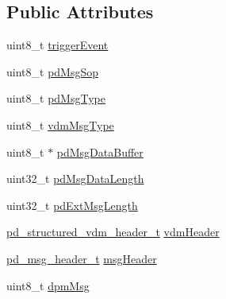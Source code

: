 \subsection*{Public Attributes}
\begin{DoxyCompactItemize}
\item 
uint8\-\_\-t \hyperlink{struct__psm__trigger__info_a4ad5cd13544e540fbd9a6bb06a041732}{trigger\-Event}
\item 
uint8\-\_\-t \hyperlink{struct__psm__trigger__info_a27c2acd560222336245db0a281cc5c1c}{pd\-Msg\-Sop}
\item 
uint8\-\_\-t \hyperlink{struct__psm__trigger__info_a0c8121495f67a38197784329ebbc1d8e}{pd\-Msg\-Type}
\item 
uint8\-\_\-t \hyperlink{struct__psm__trigger__info_a3a905de589c3b9f39958a1597865286b}{vdm\-Msg\-Type}
\item 
uint8\-\_\-t $\ast$ \hyperlink{struct__psm__trigger__info_ab8dad32f7d50d933824c9ea766850ab8}{pd\-Msg\-Data\-Buffer}
\item 
uint32\-\_\-t \hyperlink{struct__psm__trigger__info_a66249e3b8cea619fbf9a42e72fba5c18}{pd\-Msg\-Data\-Length}
\item 
uint32\-\_\-t \hyperlink{struct__psm__trigger__info_af56dc6655fd68a5ff26971f036d93383}{pd\-Ext\-Msg\-Length}
\item 
\hyperlink{group__usb__pd__stack_ga245b8bec3f3b7771e73016ac98595570}{pd\-\_\-structured\-\_\-vdm\-\_\-header\-\_\-t} \hyperlink{struct__psm__trigger__info_a7a85c1bb9ac095e9b66d4c147496d5f4}{vdm\-Header}
\item 
\hyperlink{group__usb__pd__stack_ga38ef16bfe01e9e07d6b3ac77648c6bee}{pd\-\_\-msg\-\_\-header\-\_\-t} \hyperlink{struct__psm__trigger__info_a2d5eac633a3f806ce33111067b23c6df}{msg\-Header}
\item 
uint8\-\_\-t \hyperlink{struct__psm__trigger__info_ad7f05d06a3113ff4fa5ea1cb6cc0cf83}{dpm\-Msg}
\end{DoxyCompactItemize}


